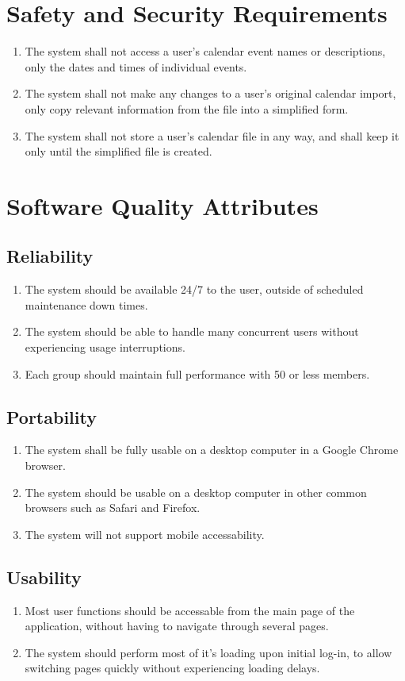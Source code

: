 \documentclass{scrreprt}
\begin{document}
\section{Safety and Security Requirements}
\begin{enumerate}
\item The system shall not access a user's calendar event names or descriptions, 
only the dates and times of individual events.
\item The system shall not make any changes to a user's original calendar import,
only copy relevant information from the file into a simplified form.
\item The system shall not store a user's calendar file in any way, and shall
keep it only until the simplified file is created.
\end{enumerate}

\section{Software Quality Attributes}

\subsection{Reliability}
\begin{enumerate}
\item The system should be available 24/7 to the user, outside of scheduled maintenance
down times.
\item The system should be able to handle many concurrent users without experiencing
usage interruptions.
\item Each group should maintain full performance with 50 or less members. 
\end{enumerate}

\subsection{Portability}
\begin{enumerate}
\item The system shall be fully usable on a desktop computer in a Google Chrome
browser.
\item The system should be usable on a desktop computer in other common browsers
such as Safari and Firefox.
\item The system will not support mobile accessability.
\end{enumerate}

\subsection{Usability}
\begin{enumerate}
\item Most user functions should be accessable from the main page of the application,
without having to navigate through several pages.
\item The system should perform most of it's loading upon initial log-in, to allow
switching pages quickly without experiencing loading delays.
\end{enumerate}
\end{document}
